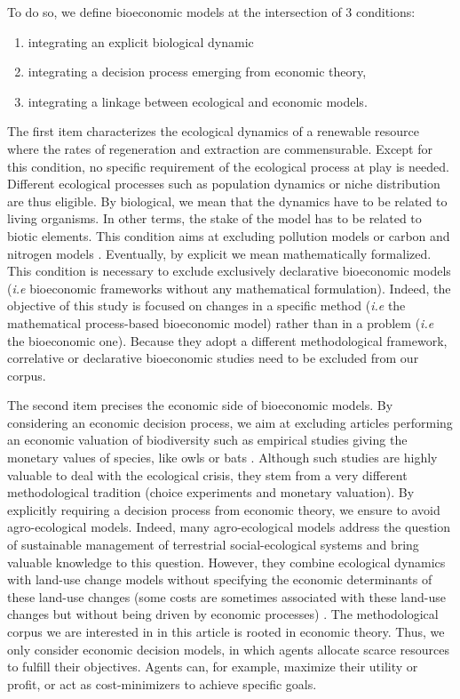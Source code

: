 To do so, we define bioeconomic models at the intersection of 3 conditions:
\begin{enumerate}
\item integrating an explicit biological dynamic 
\item integrating a decision process emerging from economic theory,
\item integrating a linkage between ecological and economic models.
\end{enumerate}

The first item characterizes the ecological dynamics of a renewable resource where the rates of regeneration and extraction are  commensurable.  Except for this condition, no specific requirement of the ecological process at play is needed. Different ecological processes such as population dynamics or niche distribution are thus eligible. 
By biological, we mean that the dynamics have to be related to living organisms. In other terms, the stake of the model has to be related to biotic elements. This condition aims at excluding pollution models or carbon and nitrogen models \citep{Nordhaus94,Lemoine2014}.
Eventually, by explicit we mean mathematically formalized. This condition is necessary to exclude exclusively declarative bioeconomic models (\textit{i.e} bioeconomic frameworks without any mathematical formulation). Indeed, the objective of this study is focused on changes in a specific method (\textit{i.e} the mathematical process-based bioeconomic model) rather than in a problem (\textit{i.e} the bioeconomic one). Because they adopt a different methodological framework, correlative or declarative bioeconomic studies need to be excluded from our corpus. 

The second item precises the economic side of bioeconomic models. 
By considering an economic decision process, we aim at excluding articles performing an economic valuation of biodiversity such as empirical studies giving the monetary values of species, like owls or bats \citep{MONTGOMERY1994,BeesCVM}. Although such studies are highly valuable to deal with the ecological crisis, they stem from a very different methodological tradition (choice experiments and monetary valuation). By explicitly requiring a decision process from economic theory, we ensure to avoid agro-ecological models. Indeed, many agro-ecological models address the question of sustainable management of terrestrial social-ecological systems and bring valuable knowledge to this question. However, they combine ecological dynamics with land-use change models without specifying the economic determinants of these land-use changes (some costs are sometimes associated with these land-use changes but without being driven by economic processes) \citep{SABATIER2010}. The methodological corpus we are interested in in this article is rooted in economic theory. Thus, we only consider economic decision models, in which agents allocate scarce resources to fulfill their objectives. Agents can, for example, maximize their utility or profit, or act as cost-minimizers to achieve specific goals. 

